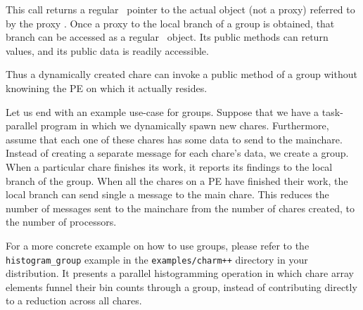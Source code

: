 This call returns a regular \CC\ pointer to the actual object (not a proxy)
referred to by the proxy .  Once a proxy to the
local branch of a group is obtained, that branch can be accessed as a regular
\CC\ object.  Its public methods can return values, and its public data is 
readily accessible.

Thus a dynamically created chare can invoke a public method of a
group without knowining the PE on which it actually resides. 

Let us end with an example use-case for groups.
Suppose that we have a task-parallel program in which we dynamically spawn
new chares. Furthermore, assume that each one of these chares has some data
to send to the mainchare.  Instead of creating a separate message for each 
chare's data, we create a group. When a particular chare
finishes its work, it reports its findings to the local branch of the group.
When all the chares on a PE have finished their work, the local branch
can send single a message to the main chare.  This reduces the number of messages
sent to the mainchare from the number of chares created, to the number of processors. 

For a more concrete example on how to use groups, please refer to the {\tt
histogram\_group} example in the {\tt examples/charm++} directory in your
\charmpp{} distribution. It presents a parallel histogramming operation in
which chare array elements funnel their bin counts through a group, instead of
contributing directly to a reduction across all chares. 

